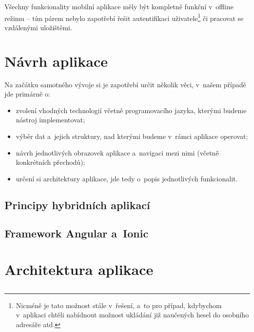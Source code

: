Všechny funkcionality mobilní aplikace měly být kompletně funkční
v~offline režimu -- tím párem nebylo zapotřebí řešit autentifikaci
uživatele\footnote{Nicméně je tato možnost stále v~řešení, a~to pro případ, kdybychom v~aplikaci chtěli nabídnout možnost ukládání již naučených hesel do osobního adresáře atd.}
či pracovat se vzdálenými uložištěmi.

\hypertarget{nuxe1vrh-aplikace}{%
\section{Návrh aplikace}\label{nuxe1vrh-aplikace}}

Na začátku samotného vývoje si je zapotřebí určit několik věci, v~našem
případě jde primárně o:

\begin{itemize}
\tightlist
\item
  zvolení vhodných technologií včetně programovacího jazyka, kterými
  budeme nástroj implementovat;
\item
  výběr dat a~jejich struktury, nad kterými budeme v~rámci aplikace
  operovat;
\item
  návrh jednotlivých obrazovek aplikace a~navigaci mezi nimi (včetně
  konkrétních přechodů);
\item
  určení si architektury aplikace, jde tedy o~popis jednotlivých
  funkcionalit.
\end{itemize}

\hypertarget{principy-hybridnuxedch-aplikacuxed}{%
\subsection{Principy hybridních
aplikací}\label{principy-hybridnuxedch-aplikacuxed}}

\hypertarget{framework-angular-a-ionic}{%
\subsection{Framework Angular
a~Ionic}\label{framework-angular-a-ionic}}

\hypertarget{architektura-aplikace}{%
\section{Architektura aplikace}\label{architektura-aplikace}}

\hypertarget{section}{%
\subsection{}\label{section}}
